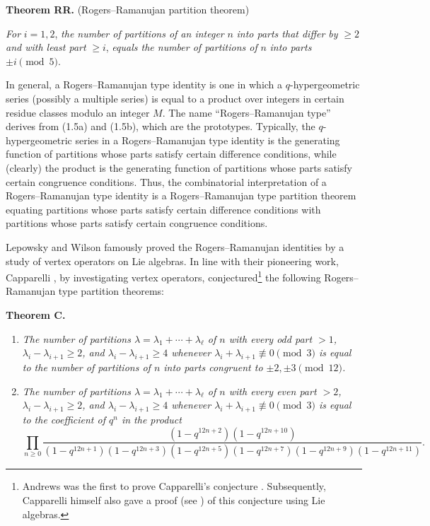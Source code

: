 \documentclass[12pt,a4paper]{amsart}
\theoremstyle{definition}
\theoremstyle{notation}
\theoremstyle{corollary}
\begin{document}
{\bf{Theorem RR.}} (Rogers--Ramanujan partition theorem)

{\it{For}} $i=1,2$, {\it{the number of partitions of an integer}} $n$ {\it{into
parts that differ by}} $\ge 2$ {\it{and with least part}} $\ge i$, {\it{equals
the number of partitions of}} $n$ {\it{into parts}} $\pm i\pmod{5}$.
\medskip

In general, a Rogers--Ramanujan type identity is one in which a $q$-hypergeometric series (possibly a multiple series) is equal to a product over integers in certain residue classes modulo an integer $M$. The name ``Rogers--Ramanujan type'' derives from (1.5a) and (1.5b), which are the prototypes. Typically, the $q$-hypergeometric series in a Rogers--Ramanujan type identity is the generating function of partitions whose parts satisfy certain difference conditions, while (clearly) the product is the generating function of partitions whose parts satisfy certain congruence conditions. Thus, the combinatorial interpretation of a Rogers--Ramanujan type identity is a Rogers--Ramanujan type partition theorem equating partitions whose parts satisfy certain difference conditions with partitions whose parts satisfy certain congruence conditions.  

Lepowsky and Wilson \cite{LW1,LW2} famously proved the Rogers--Ramanujan identities by a study of vertex operators on Lie algebras. In line with their pioneering work, Capparelli \cite{SC93}, by investigating vertex operators, conjectured\footnote{Andrews was the first to prove Capparelli's conjecture  \cite{GEA94}. Subsequently, Capparelli himself also gave a proof (see \cite{SC96}) of this conjecture using Lie algebras.} the following Rogers--Ramanujan type partition theorems:
\medskip

{\bf{Theorem C.}}
\begin{enumerate}[label=(\roman*)] 
\item \textit{The number of partitions $ \lambda= \lambda_1 +\cdots +\lambda_{\ell}$  of $n$ with every odd part $>1$, $\lambda_i-\lambda_{i+1}\geq 2$, and $\lambda_i-\lambda_{i+1}\geq 4$ whenever $\lambda_i+\lambda_{i+1}\not \equiv 0 \pmod{3}$ is equal to the number of partitions of $n$ into parts congruent to $\pm 2, \pm 3\pmod{12}$.}\\
\item \textit{The number of partitions $ \lambda= \lambda_1 +\cdots +\lambda_{\ell}$  of $n$ with every even part $>2$, $\lambda_i-\lambda_{i+1}\geq 2$, and $\lambda_i-\lambda_{i+1}\geq 4$ whenever $\lambda_i+\lambda_{i+1}\not \equiv 0 \pmod{3}$ is equal to the coefficient of $q^n$ in the product}
\[\prod_{n\geq 0}\frac{(1-q^{12n+2})(1-q^{12n+10})}{(1-q^{12n+1})(1-q^{12n+3})(1-q^{12n+5})(1-q^{12n+7})(1-q^{12n+9})(1-q^{12n+11})}.\]
\end{enumerate}
\end{document}
